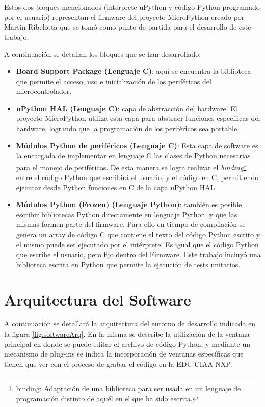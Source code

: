 Estos dos bloques mencionados (intérprete uPython y código Python programado por el usuario) representan el firmware del proyecto MicroPython creado por Martin Ribelotta que se tomó como punto de partida para el desarrollo de este trabajo. 

A continuación se detallan los bloques que se han desarrollado:

\begin{itemize}
	\item \textbf{Board Support Package (Lenguaje C)}: aquí se encuentra la biblioteca que permite el acceso, uso e inicialización de los periféricos del microcontrolador.
	\item \textbf{uPython HAL (Lenguaje C)}: capa de abstracción del hardware. El proyecto MicroPython utiliza esta capa para abstraer funciones específicas del hardware, logrando que la programación de los periféricos sea portable.
	\item \textbf{Módulos Python de periféricos (Lenguaje C)}: Esta capa de software es la encargada de implementar en lenguaje C las clases de Python necesarias para el manejo de periféricos. De esta manera se logra realizar el \textit{binding}\footnote{binding: Adaptación de una biblioteca para ser usada en un lenguaje de programación distinto de aquél en el que ha sido escrita.} entre el código Python que escribirá el usuario, y el código en C, permitiendo ejecutar desde Python funciones en C de la capa uPython HAL.
	\item \textbf{Módulos Python (Frozen) (Lenguaje Python)}: también es posible escribir bibliotecas Python directamente en lenguaje Python, y que las mismas formen parte del firmware. Para ello en tiempo de compilación se genera un array de código C que contiene el texto del código Python escrito y el mismo puede ser ejecutado por el intérprete. Es igual que el código Python que escribe el usuario, pero fijo dentro del Firmware. Este trabajo incluyó una biblioteca escrita en Python que permite la ejecución de tests unitarios.
\end{itemize}


\section{Arquitectura del Software}
\label{sec:softwareArq}

A continuación se detallará la arquitectura del entorno de desarrollo indicada en la figura \ref{fig:softwareArq}. En la misma se describe la utilización de la ventana principal en donde se puede editar el archivo de código Python, y mediante un mecanismo de plug-ins se indica la incorporación de ventanas específicas que tienen que ver con el proceso de grabar el código en la EDU-CIAA-NXP. 


